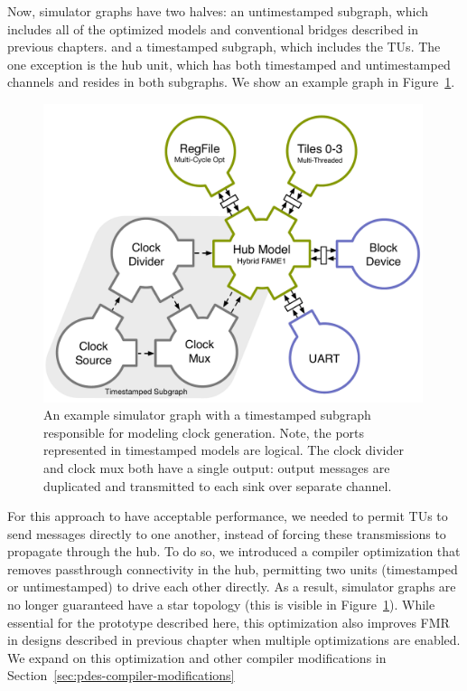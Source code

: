 Now, simulator graphs have two halves: an untimestamped
subgraph, which includes all of the optimized models and conventional bridges
described in previous chapters. and a timestamped subgraph, which includes the
TUs. The one exception is the hub unit, which has both
timestamped and untimestamped channels and resides in both subgraphs. We show
an example graph in Figure~\ref{fig:gg-graph-pdes}.

\begin{figure}
    \centering
    \includegraphics[width=0.99\textwidth]{figures/gg-graph-pdes.pdf}
    \caption{An example simulator graph with a timestamped subgraph
    responsible for modeling clock generation.  Note, the ports represented in
    timestamped models are logical. The clock divider and clock mux both have a
    single output: output messages are duplicated and transmitted to each sink
    over separate channel.}
    \label{fig:gg-graph-pdes}
\end{figure}

For this approach to have acceptable performance, we needed to permit TUs to
send messages directly to one another, instead of forcing these transmissions
to propagate through the hub.  To do so, we introduced a compiler optimization
that removes passthrough connectivity in the hub, permitting two units
(timestamped or untimestamped) to drive each other directly. As a result,
simulator graphs are no longer guaranteed have a star topology (this is
visible in Figure~\ref{fig:gg-graph-pdes}).  While essential for the prototype
described here, this optimization also improves FMR in designs described in
previous chapter when multiple optimizations are enabled. We expand on this
optimization and other compiler modifications in Section~\ref{sec:pdes-compiler-modifications}

